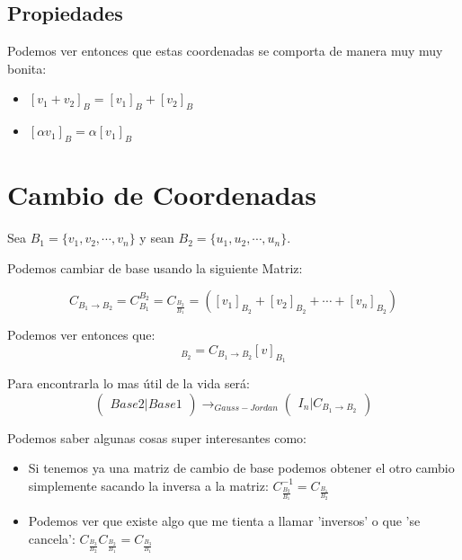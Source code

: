 \documentclass[12pt]{report}							    %
\begin{document}
        \subsection{Propiedades}
        Podemos ver entonces que estas coordenadas se comporta de manera muy muy bonita:

        \begin{itemize}
            \item $[v_1 + v_2]_B = [v_1]_B + [v_2]_B$
            \item $[\alpha v_1]_B = \alpha [v_1]_B$
        \end{itemize}



    \clearpage
    \section{Cambio de Coordenadas}

        Sea $B_1 = \{v_1,v_2, \cdots, v_n\}$ y sean  $B_2 = \{u_1,u_2, \cdots, u_n\}$.

        Podemos cambiar de base usando la siguiente Matriz:

        \begin{equation*}
            C_{B_1 \to B_2}= C_{B_1}^{B_2} = C_{\frac{B_2}{B_1}} = \left( [v_1]_{B_2} + [v_2]_{B_2} + \cdots + [v_n]_{B_2}   \right)
        \end{equation*}

        Podemos ver entonces que:
        \begin{equation*}
            [v]_{B_2} = C_{B_1 \to B_2} [v]_{B_1}
        \end{equation*}

        Para encontrarla lo mas útil de la vida será:
        \begin{equation}
            \begin{pmatrix}  Base 2  \vert Base 1 \end{pmatrix} \to_{Gauss-Jordan}
            \begin{pmatrix}  I_n  \vert C_{B_1 \to B_2} \end{pmatrix}
        \end{equation}


        Podemos saber algunas cosas super interesantes como:
        \begin{itemize}
            \item Si tenemos ya una matriz de cambio de base podemos obtener el otro cambio simplemente sacando la inversa a la matriz:
            $ C^{-1}_{\frac{B_2}{B_1}} = C_{\frac{B_1}{B_2}} $
            
            \item Podemos ver que existe algo que me tienta a llamar 'inversos' o que 'se cancela': 
            $ C_{\frac{B_3}{B_2}} C_{\frac{B_2}{B_1}} = C_{\frac{B_3}{B_1}} $

        \end{itemize}
\end{document}
